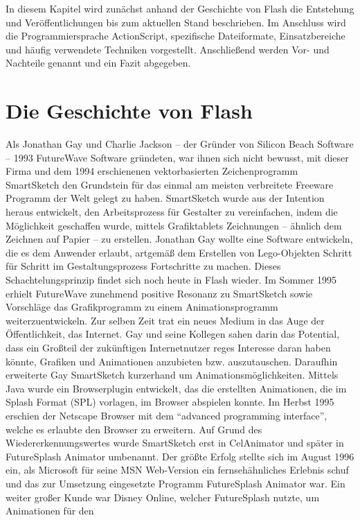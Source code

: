 In diesem Kapitel wird zunächst anhand der Geschichte von Flash die Entstehung
und Veröffentlichungen bis zum aktuellen Stand beschrieben. Im Anschluss
wird die Programmiersprache ActionScript, spezifische Dateiformate,
Einsatzbereiche und häufig verwendete Techniken vorgestellt. Anschließend
werden Vor- und Nachteile genannt und ein Fazit abgegeben.

\section{Die Geschichte von Flash}
Als Jonathan Gay und Charlie Jackson -- der Gründer von Silicon Beach
Software -- 1993 FutureWave Software gründeten, war ihnen sich nicht bewusst,
mit dieser Firma und dem 1994 erschienenen vektorbasierten Zeichenprogramm
SmartSketch den Grundstein für das einmal am meisten verbreitete Freeware
Programm der Welt gelegt zu haben.
SmartSketch wurde aus der Intention heraus entwickelt, den Arbeitsprozess für
Gestalter zu vereinfachen, indem die Möglichkeit geschaffen wurde, mittels
Grafiktablets Zeichnungen -- ähnlich dem Zeichnen auf Papier -- zu erstellen.
Jonathan Gay wollte eine Software entwickeln, die es dem Anwender erlaubt,
artgemäß dem Erstellen von Lego-Objekten Schritt für Schritt im
Gestaltungsprozess Fortschritte zu machen. Dieses Schachtelungsprinzip findet
sich noch heute in Flash wieder. Im Sommer 1995 erhielt FutureWave
zunehmend positive Resonanz zu SmartSketch sowie Vorschläge das Grafikprogramm
zu einem Animationsprogramm weiterzuentwickeln. Zur selben Zeit trat ein neues
Medium in das Auge der Öffentlichkeit, das Internet. Gay und seine Kollegen
sahen darin das Potential, dass ein Großteil der zukünftigen Internetnutzer
reges Interesse daran haben könnte, Grafiken und Animationen anzubieten bzw.
auszutauschen.
Daraufhin erweiterte Gay SmartSketch kurzerhand um Animationsmöglichkeiten.
Mittels Java wurde ein Browserplugin entwickelt, das die erstellten
Animationen, die im Splash Format (SPL) vorlagen, im Browser abspielen konnte.
Im Herbst 1995 erschien der Netscape Browser mit dem ``advanced programming
interface'', welche es erlaubte den Browser zu erweitern. Auf Grund des
Wiedererkennungswertes wurde SmartSketch erst in CelAnimator und später in
FutureSplash Animator umbenannt.
Der größte Erfolg stellte sich im August 1996 ein, als Microsoft für seine
MSN Web-Version ein fernsehähnliches Erlebnis schuf und das zur Umsetzung
eingesetzte Programm FutureSplash Animator war. Ein weiter großer Kunde
war Disney Online, welcher FutureSplash nutzte, um Animationen für den
